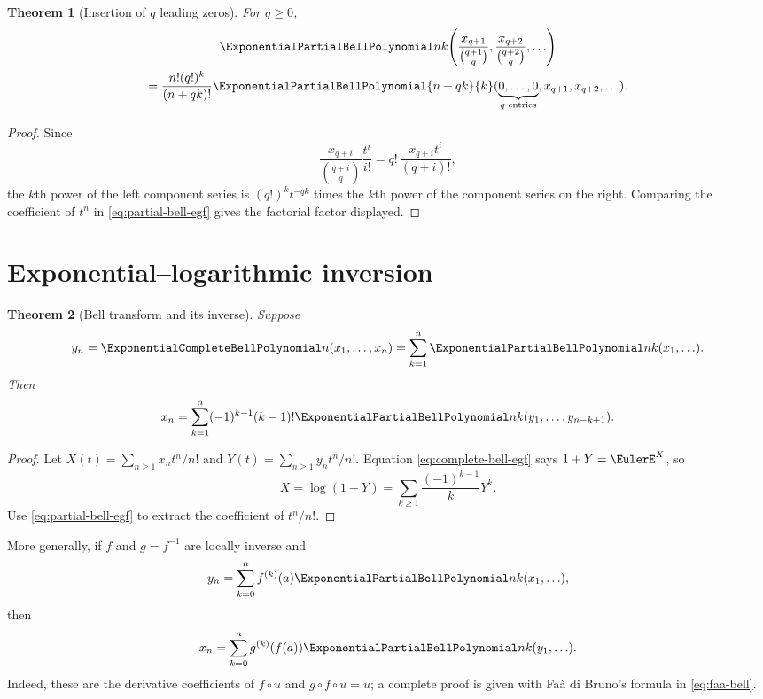 \documentclass[11pt,a4paper,oneside,openany]{book}
\newtheorem{theorem}{Theorem}[chapter]
\theoremstyle{definition}
\theoremstyle{remark}
\begin{document}
\begin{theorem}[Insertion of $q$ leading zeros]\label{thm:bell-leading-zeros}
For $q\ge0$,
\begin{multline}\label{eq:bell-leading-zeros}
 \ExponentialPartialBellPolynomial nk\!\left(
 \frac{x_{q+1}}{\binom{q+1}{q}},
 \frac{x_{q+2}}{\binom{q+2}{q}},\ldots\right)\\
 =\frac{n!(q!)^k}{(n+qk)!}
 \ExponentialPartialBellPolynomial{n+qk}{k}(\underbrace{0,\ldots,0}_{q\text{ entries}},
 x_{q+1},x_{q+2},\ldots).
\end{multline}
\end{theorem}
\begin{proof}
Since
\[
 \frac{x_{q+i}}{\binom{q+i}{q}}\frac{t^i}{i!}
 =q!\,\frac{x_{q+i}t^i}{(q+i)!},
\]
the $k$th power of the left component series is $(q!)^k t^{-qk}$ times the
$k$th power of the component series on the right.  Comparing the coefficient of
$t^n$ in \eqref{eq:partial-bell-egf} gives the factorial factor displayed.
\end{proof}

\section{Exponential--logarithmic inversion}
\begin{theorem}[Bell transform and its inverse]\label{thm:bell-transform-inverse}
Suppose
\begin{equation}\label{eq:bell-transform-y}
 y_n=\ExponentialCompleteBellPolynomial n(x_1,\ldots,x_n)=\sum_{k=1}^{n}\ExponentialPartialBellPolynomial nk(x_1,\ldots).
\end{equation}
Then
\begin{equation}\label{eq:bell-transform-x}
 x_n=\sum_{k=1}^{n}(-1)^{k-1}(k-1)!
 \ExponentialPartialBellPolynomial nk(y_1,\ldots,y_{n-k+1}).
\end{equation}
\end{theorem}
\begin{proof}
Let $X(t)=\sum_{n\ge1}x_nt^n/n!$ and
$Y(t)=\sum_{n\ge1}y_nt^n/n!$.  Equation
\eqref{eq:complete-bell-egf} says $1+Y=\EulerE^X$, so
\[
 X=\log(1+Y)=\sum_{k\ge1}\frac{(-1)^{k-1}}{k}Y^k.
\]
Use \eqref{eq:partial-bell-egf} to extract the coefficient of $t^n/n!$.
\end{proof}

More generally, if $f$ and $g=f^{-1}$ are locally inverse and
\begin{equation}\label{eq:general-bell-transform}
 y_n=\sum_{k=0}^{n}f^{(k)}(a)\ExponentialPartialBellPolynomial nk(x_1,\ldots),
\end{equation}
then
\begin{equation}\label{eq:general-bell-inverse}
 x_n=\sum_{k=0}^{n}g^{(k)}(f(a))\ExponentialPartialBellPolynomial nk(y_1,\ldots).
\end{equation}
Indeed, these are the derivative coefficients of $f\circ u$ and
$g\circ f\circ u=u$; a complete proof is given with Fa\`a di Bruno's formula in
\cref{eq:faa-bell}.
\end{document}
